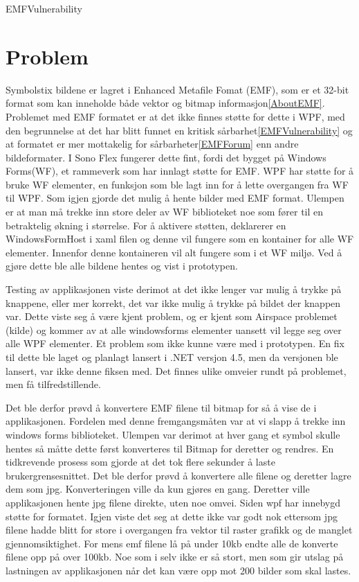 EMFVulnerability
\section{Problem}

Symbolstix bildene er lagret i Enhanced Metafile Fomat (EMF), som er et 32-bit format som kan inneholde både vektor og bitmap informasjon\ref{AboutEMF}. Problemet med EMF formatet er at det ikke finnes støtte for dette i WPF, med den begrunnelse at det har blitt funnet en kritisk sårbarhet\ref{EMFVulnerability} og at formatet er mer mottakelig for sårbarheter\ref{EMFForum} enn andre bildeformater. I Sono Flex fungerer dette fint, fordi det bygget på Windows Forms(WF),  et rammeverk som har innlagt støtte for EMF. WPF har støtte for å bruke WF elementer,  en funksjon som ble lagt inn for å lette overgangen fra WF til WPF. Som igjen gjorde det mulig å hente bilder med EMF format. Ulempen er at man må trekke inn store deler av WF biblioteket noe som fører til en betraktelig økning i størrelse. For å aktivere støtten, deklarerer en WindowsFormHost i xaml filen og denne vil fungere som en kontainer for alle WF elementer. Innenfor denne kontaineren vil alt fungere som i et WF miljø. Ved å gjøre dette ble alle bildene hentes og vist i prototypen. 

Testing av applikasjonen viste derimot at det ikke lenger var mulig å trykke på knappene, eller mer korrekt, det var ikke mulig å trykke på  bildet der knappen var. Dette viste seg å være kjent problem, og er kjent som Airspace problemet (kilde) og kommer av at alle windowsforms elementer uansett vil legge seg over alle WPF elementer. Et problem som ikke kunne være med i prototypen. En fix til dette ble laget og planlagt lansert i .NET versjon 4.5, men da versjonen ble lansert, var ikke denne fiksen med. Det finnes ulike omveier rundt på problemet, men få tilfredstillende. 

Det ble derfor prøvd å konvertere EMF filene til bitmap for så å vise de i applikasjonen. Fordelen med denne fremgangsmåten var at vi slapp å trekke inn windows forms biblioteket. Ulempen var derimot at hver gang et symbol skulle hentes så måtte dette først konverteres til Bitmap for deretter og rendres. En tidkrevende prosess som gjorde at det tok flere sekunder å laste brukergrensesnittet. Det ble derfor prøvd å konvertere alle filene og deretter lagre dem som jpg. Konverteringen ville da kun gjøres en gang. Deretter ville applikasjonen hente jpg filene direkte, uten noe omvei. Siden wpf har innebygd støtte for formatet. Igjen viste det seg at dette ikke var godt nok ettersom jpg filene hadde blitt for store i overgangen fra vektor til raster grafikk og de manglet gjennomsiktighet. For mens emf filene lå på under 10kb endte alle de konverte filene opp på over 100kb. Noe som i selv ikke er så stort, men som gir utslag på lastningen av applikasjonen når det kan være opp mot 200 bilder som skal lastes.

